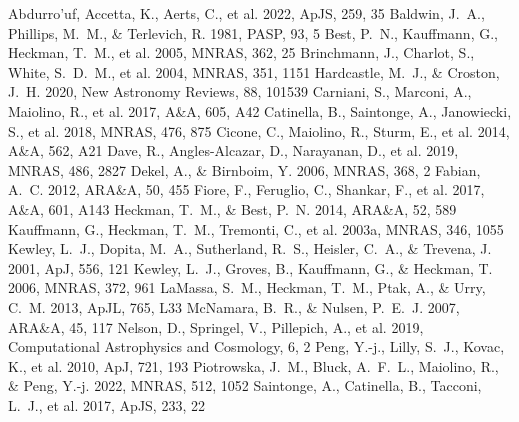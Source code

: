 \documentclass[twocolumn]{aastex631}
\begin{document}
\begin{thebibliography}{}
 Abdurro'uf, Accetta, K., Aerts, C., et al. 2022, ApJS, 259, 35
 Baldwin, J.~A., Phillips, M.~M., \& Terlevich, R. 1981, PASP, 93, 5
 Best, P.~N., Kauffmann, G., Heckman, T.~M., et al. 2005, MNRAS, 362, 25
 Brinchmann, J., Charlot, S., White, S.~D.~M., et al. 2004, MNRAS, 351, 1151
 Hardcastle, M.~J., \& Croston, J.~H. 2020, New Astronomy Reviews, 88, 101539
 Carniani, S., Marconi, A., Maiolino, R., et al. 2017, A\&A, 605, A42
 Catinella, B., Saintonge, A., Janowiecki, S., et al. 2018, MNRAS, 476, 875
 Cicone, C., Maiolino, R., Sturm, E., et al. 2014, A\&A, 562, A21
 Dave, R., Angles-Alcazar, D., Narayanan, D., et al. 2019, MNRAS, 486, 2827
 Dekel, A., \& Birnboim, Y. 2006, MNRAS, 368, 2
 Fabian, A.~C. 2012, ARA\&A, 50, 455
 Fiore, F., Feruglio, C., Shankar, F., et al. 2017, A\&A, 601, A143
 Heckman, T.~M., \& Best, P.~N. 2014, ARA\&A, 52, 589
 Kauffmann, G., Heckman, T.~M., Tremonti, C., et al. 2003a, MNRAS, 346, 1055
 Kewley, L.~J., Dopita, M.~A., Sutherland, R.~S., Heisler, C.~A., \& Trevena, J. 2001, ApJ, 556, 121
 Kewley, L.~J., Groves, B., Kauffmann, G., \& Heckman, T. 2006, MNRAS, 372, 961
 LaMassa, S.~M., Heckman, T.~M., Ptak, A., \& Urry, C.~M. 2013, ApJL, 765, L33
 McNamara, B.~R., \& Nulsen, P.~E.~J. 2007, ARA\&A, 45, 117
 Nelson, D., Springel, V., Pillepich, A., et al. 2019, Computational Astrophysics and Cosmology, 6, 2
 Peng, Y.-j., Lilly, S.~J., Kovac, K., et al. 2010, ApJ, 721, 193
 Piotrowska, J.~M., Bluck, A.~F.~L., Maiolino, R., \& Peng, Y.-j. 2022, MNRAS, 512, 1052
 Saintonge, A., Catinella, B., Tacconi, L.~J., et al. 2017, ApJS, 233, 22

\end{thebibliography}
\end{document}
